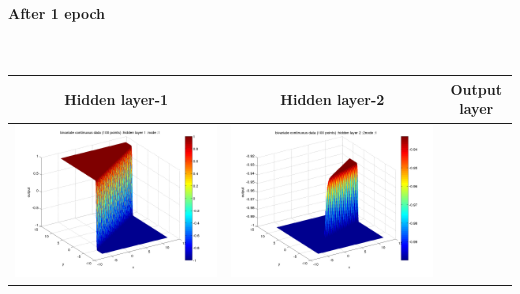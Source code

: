 \documentclass[fleqn]{article}
\newcommand{\myparagraph}[1]{\paragraph{#1}\mbox{}\\}
\begin{document}
\myparagraph{After 1 epoch}
\begin{center}
  \begin{longtable}{ c | c | r }
	\multicolumn{1}{c}{Hidden layer-1 } & 
	\multicolumn{1}{c}{Hidden layer-2 } & 
	\multicolumn{1}{c}{Output layer} \\
    \hline
    \includegraphics[scale=0.25]{./pics/bivariate100/_2_4/_2_4_epoch_1_hidden layer 1 :1}  &  \includegraphics[scale=0.25]{./pics/bivariate100/_2_4/_2_4_epoch_1_hidden layer 2 :21} &  \\ 

\end{longtable}
\end{center}
\end{document}
